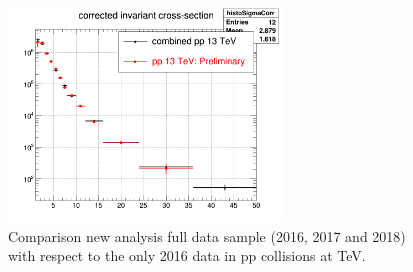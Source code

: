 \begin{figure}[tb]
\begin{center}
\includegraphics[width=0.65\textwidth]{figures/Dstar/pp13TeV/comparison_plt_dstar.png}
\caption{Comparison new analysis full data sample (2016, 2017 and 2018) with respect to the only 2016 data in pp collisions at  TeV.} 
\label{fig:DmesonCorrYields}
\end{center}
\end{figure}


